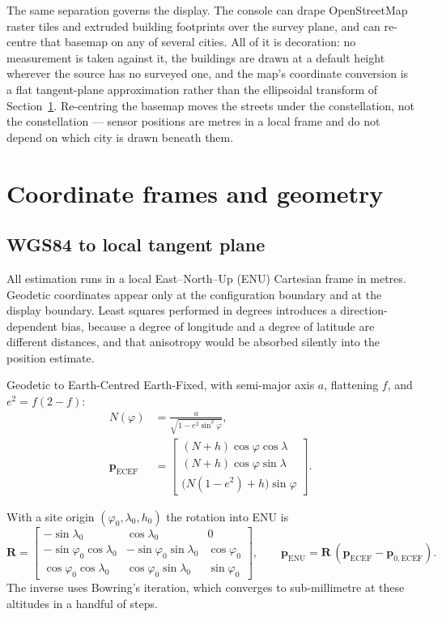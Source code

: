 \documentclass[11pt,a4paper]{article}
\begin{document}
The same separation governs the display. The console can drape
OpenStreetMap raster tiles and extruded building footprints over the survey
plane, and can re-centre that basemap on any of several cities. All of it is
decoration: no measurement is taken against it, the buildings are drawn at a
default height wherever the source has no surveyed one, and the map's
coordinate conversion is a flat tangent-plane approximation rather than the
ellipsoidal transform of Section~\ref{sec:frames}. Re-centring the basemap
moves the streets under the constellation, not the constellation --- sensor
positions are metres in a local frame and do not depend on which city is
drawn beneath them.

\section{Coordinate frames and geometry}
\label{sec:frames}

\subsection{WGS84 to local tangent plane}

All estimation runs in a local East--North--Up (ENU) Cartesian frame in
metres. Geodetic coordinates appear only at the configuration boundary and
at the display boundary. Least squares performed in degrees introduces a
direction-dependent bias, because a degree of longitude and a degree of
latitude are different distances, and that anisotropy would be absorbed
silently into the position estimate.

Geodetic to Earth-Centred Earth-Fixed, with semi-major axis $a$, flattening
$f$, and $e^2=f(2-f)$:
\begin{align}
  N(\varphi) &= \frac{a}{\sqrt{1-e^{2}\sin^{2}\varphi}}, \\
  \mathbf{p}_{\text{ECEF}} &=
  \begin{bmatrix}
    (N+h)\cos\varphi\cos\lambda\\
    (N+h)\cos\varphi\sin\lambda\\
    \bigl(N(1-e^{2})+h\bigr)\sin\varphi
  \end{bmatrix}.
\end{align}

With a site origin $(\varphi_0,\lambda_0,h_0)$ the rotation into ENU is
\begin{equation}
  \mathbf{R} =
  \begin{bmatrix}
    -\sin\lambda_0 & \cos\lambda_0 & 0\\
    -\sin\varphi_0\cos\lambda_0 & -\sin\varphi_0\sin\lambda_0 & \cos\varphi_0\\
     \cos\varphi_0\cos\lambda_0 &  \cos\varphi_0\sin\lambda_0 & \sin\varphi_0
  \end{bmatrix},
  \qquad
  \mathbf{p}_{\text{ENU}} = \mathbf{R}\,(\mathbf{p}_{\text{ECEF}}-\mathbf{p}_{0,\text{ECEF}}).
\end{equation}
The inverse uses Bowring's iteration, which converges to sub-millimetre at
these altitudes in a handful of steps.
\end{document}
